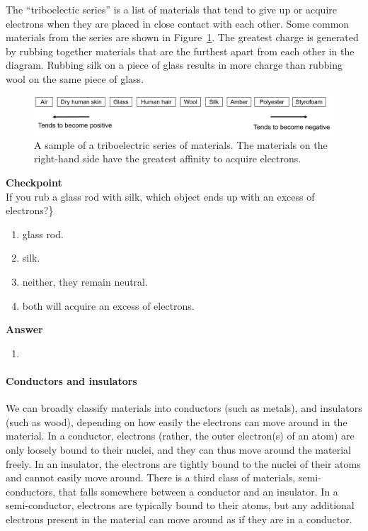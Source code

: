 The ``triboelectic series'' is a list of materials that tend to give up or acquire electrons when they are placed in close contact with each other. Some common materials from the series are shown in Figure~\ref{fig:chargesfields:triboseries}.  The greatest charge is generated by rubbing together materials that are the furthest apart from each other in the diagram. Rubbing silk on a piece of glass results in more charge than rubbing wool on the same piece of glass.

\begin{figure}[!htbp]
\centering
\includegraphics[width=1\linewidth]{files/triboseries-4b056b04414ba5a33d35300655cca63b.png}
\caption[]{A sample of a triboelectric series of materials. The materials on the right-hand side have the greatest affinity to acquire electrons.}
\label{fig:chargesfields:triboseries}
\end{figure}

\begin{framed}
\textbf{Checkpoint}\\
If you rub a glass rod with silk, which object ends up with an excess of electrons?\}

\begin{enumerate}
\item glass rod.
\item silk.
\item neither, they remain neutral.
\item both will acquire an excess of electrons.
\end{enumerate}

\begin{framed}
\textbf{Answer}\\
\begin{enumerate}[resume]
\item
\end{enumerate}
\end{framed}
\end{framed}

\paragraph{Conductors and insulators}

We can broadly classify materials into conductors (such as metals), and insulators (such as wood), depending on how easily the electrons can move around in the material. In a conductor, electrons (rather, the outer electron(s) of an atom) are only loosely bound to their nuclei, and they can thus move around the material freely. In an insulator, the electrons are tightly bound to the nuclei of their atoms and cannot easily move around. There is a third class of materials, semi-conductors, that falls somewhere between a conductor and an insulator. In a semi-conductor, electrons are typically bound to their atoms, but any additional electrons present in the material can move around as if they are in a conductor.

